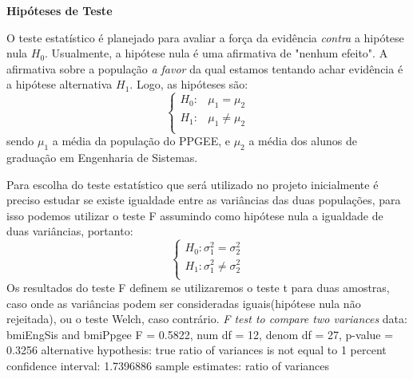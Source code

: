 \documentclass[12pt, a4paper]{article}
\begin{document}
\textbf{Hipóteses de Teste}
\par O teste estatístico é planejado para avaliar a força da evidência \textit{contra} a hipótese nula $H_{0}$. Usualmente, a hipótese nula é uma afirmativa de "nenhum efeito". A afirmativa sobre a população \textit{a favor} da qual estamos tentando achar evidência é a hipótese alternativa $H_{1}$. Logo, as hipóteses são:
\begin{equation}
\left \{
\begin{array}{cc}
H_{0}: & \mu_{1} = \mu_{2} \\
H_{1}: & \mu_{1} \neq \mu_{2} \\
\end{array}
\right.
\end{equation}
\newline sendo $\mu_{1}$ a média da população do PPGEE, e $\mu_{2}$ a média dos alunos de graduação em Engenharia de Sistemas.
\par Para escolha do teste estatístico que será utilizado no projeto inicialmente é preciso estudar se existe igualdade entre as variâncias das duas populações, para isso podemos utilizar o teste F assumindo como hipótese nula a igualdade de duas variâncias, portanto:
\begin{equation}
\left \{
\begin{array}{cc}
H_{0}: \sigma_{1}^{2} = \sigma_{2}^{2} \\
H_{1}: \sigma_{1}^{2} \neq \sigma_{2}^{2} \\
\end{array}
\right.
\end{equation}
Os resultados do teste F definem se utilizaremos o teste t para duas amostras, caso onde as variâncias podem ser consideradas iguais(hipótese nula não rejeitada), ou o teste Welch, caso contrário.
\newline
\newline
\textit{F test to compare two variances} \newline
data:  bmiEngSis and bmiPpgee \newline
F = 0.5822, num df = 12, denom df = 27, p-value = 0.3256 \newline
alternative hypothesis: true ratio of variances is not equal to 1  percent confidence interval:  1.7396886 \newline
sample estimates: \newline
ratio of variances  \newline
\end{document}
